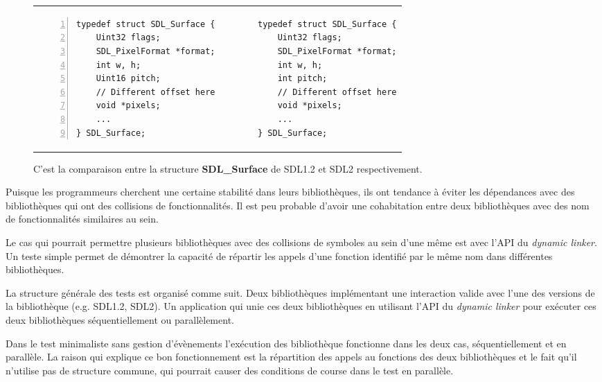 \begin{figure}[h]
  \centering
\begin{tabular}{p{18em}p{18em}}
\begin{lstlisting}[frame=single,numbers=left]
typedef struct SDL_Surface {
    Uint32 flags;
    SDL_PixelFormat *format;
    int w, h;
    Uint16 pitch;
    // Different offset here
    void *pixels;
    ...
} SDL_Surface;
\end{lstlisting}&
\begin{lstlisting}[frame=single,numbers=right]
typedef struct SDL_Surface {
    Uint32 flags;
    SDL_PixelFormat *format;
    int w, h;
    int pitch;
    // Different offset here
    void *pixels;
    ...
} SDL_Surface;
\end{lstlisting}\\
\end{tabular}
  \caption{C'est la comparaison entre la structure \textbf{SDL\_Surface} de SDL1.2 et SDL2 respectivement.}
  \label{fig:sdl_surface}
\end{figure}

Puisque les programmeurs cherchent une certaine stabilité dans leurs bibliothèques, ils ont
tendance à éviter les dépendances avec des bibliothèques qui ont des collisions de fonctionnalités.
Il est peu probable d'avoir une cohabitation entre deux bibliothèques avec des nom de fonctionnalités
similaires au sein.

Le cas qui pourrait permettre plusieurs bibliothèques avec des collisions de symboles
au sein d'une même est avec l'API du \textit{dynamic linker}. Un teste simple permet
de démontrer la capacité de répartir les appels d'une fonction identifié par le même nom
dans différentes bibliothèques.

La structure générale des tests est organisé comme suit. Deux bibliothèques implémentant
une interaction valide avec l'une des versions de la bibliothèque (e.g. SDL1.2, SDL2).
Un application qui unie ces deux bibliothèques en utilisant l'API du
\textit{dynamic linker} pour exécuter ces deux bibliothèques séquentiellement ou
parallèlement.


Dans le test minimaliste sans gestion d'évènements l'exécution des bibliothèque
fonctionne dans les deux cas, séquentiellement et en parallèle. La raison qui
explique ce bon fonctionnement est la répartition des appels au fonctions
des deux bibliothèques et le fait qu'il n'utilise pas de structure commune,
qui pourrait causer des conditions de course dans le test en parallèle.

